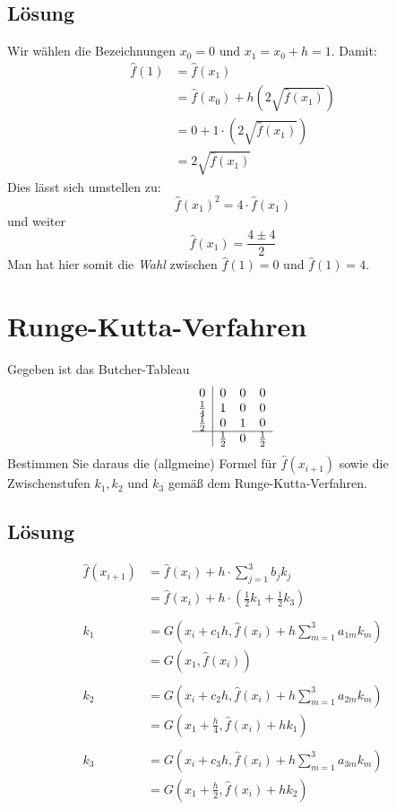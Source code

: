 \subsection*{Lösung}
Wir wählen die Bezeichnungen $x_0=0$ und $x_1=x_0+h=1$. Damit:
\begin{align*}
\hat f(1)&=\hat f(x_1)\\
&=\hat f(x_0)+h \left(2\sqrt{\hat f(x_1)}\right)\\
&=0+1\cdot\left(2\sqrt{\hat f(x_1)}\right)\\
&=2\sqrt{\hat f(x_1)}
\end{align*}
Dies lässt sich umstellen zu:
$$
\hat f(x_1)^2=4\cdot \hat f(x_1)
$$
und weiter
$$
\hat f(x_1)=\frac{4\pm 4}{2}
$$
Man hat hier somit die \textit{Wahl} zwischen $\hat f(1)=0$ und $\hat f(1)=4$.
\newpage
\section{Runge-Kutta-Verfahren}
Gegeben ist das Butcher-Tableau
$$
\begin{array}{c|ccc}
0 & 0 & 0 & 0\\
\frac{1}{4} & 1 & 0 & 0\\
\frac{1}{2} & 0 & 1 & 0\\ \hline
 & \frac{1}{2} & 0 &  \frac{1}{2}
\end{array}
$$
Bestimmen Sie daraus die (allgmeine) Formel für $\hat f(x_{i+1})$ sowie die Zwischenstufen $k_1,k_2$ und $k_3$ gemäß dem Runge-Kutta-Verfahren.
\subsection*{Lösung}
\begin{align*}
\hat f(x_{i+1})&=\hat f(x_i)+h\cdot \sum_{j=1}^3 b_jk_j\\
&=\hat f(x_i)+h\cdot \left(\frac{1}{2}k_1 + \frac{1}{2}k_3 \right)\\
&\\
k_1&=G(x_i+c_1h, \hat f(x_i)+h\sum_{m=1}^3 a_{1m}k_m)\\
&=G(x_1, \hat f(x_i)) \\
&\\
k_2&=G(x_i+c_2h, \hat f(x_i)+h\sum_{m=1}^3 a_{2m}k_m)  \\
&=G(x_1+\frac{h}{4}, \hat f(x_i)+hk_1) \\
&\\
k_3&=G(x_i+c_3h, \hat f(x_i)+h\sum_{m=1}^3 a_{3m}k_m)  \\
&=G(x_1+\frac{h}{2}, \hat f(x_i)+hk_2) \\
\end{align*}
%
%
